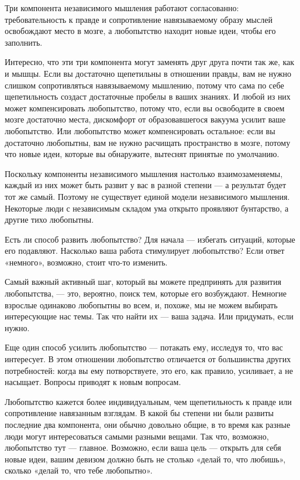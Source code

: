 \documentclass[ebook,12pt,oneside,openany]{memoir}
\begin{document}
Три компонента независимого мышления работают согласованно:
требовательность к правде и сопротивление навязываемому образу мыслей
освобождают место в мозге, а любопытство находит новые идеи, чтобы его
заполнить. \newline

Интересно, что эти три компонента могут заменять друг друга почти так
же, как и мышцы. Если вы достаточно щепетильны в отношении правды, вам
не нужно слишком сопротивляться навязываемому мышлению, потому что
сама по себе щепетильность создаст достаточные пробелы в ваших
знаниях. И любой из них может компенсировать любопытство, потому что,
если вы освободите в своем мозге достаточно места, дискомфорт от
образовавшегося вакуума усилит ваше любопытство. Или любопытство может
компенсировать остальное: если вы достаточно любопытны, вам не нужно
расчищать пространство в мозге, потому что новые идеи, которые вы
обнаружите, вытеснят принятые по умолчанию. \newline

Поскольку компоненты независимого мышления настолько взаимозаменяемы,
каждый из них может быть развит у вас в разной степени — а результат
будет тот же самый. Поэтому не существует единой модели независимого
мышления. Некоторые люди с независимым складом ума открыто проявляют
бунтарство, а другие тихо любопытны. \newline

Есть ли способ развить любопытство? Для начала — избегать ситуаций,
которые его подавляют. Насколько ваша работа стимулирует любопытство?
Если ответ «немного», возможно, стоит что-то изменить. \newline

Самый важный активный шаг, который вы можете предпринять для развития
любопытства, — это, вероятно, поиск тем, которые его возбуждают.
Немногие взрослые одинаково любопытны во всем, и, похоже, мы не можем
выбирать интересующие нас темы. Так что найти их — ваша задача. Или
придумать, если нужно. \newline

Еще один способ усилить любопытство — потакать ему, исследуя то, что
вас интересует. В этом отношении любопытство отличается от большинства
других потребностей: когда вы ему потворствуете, это его, как правило,
усиливает, а не насыщает. Вопросы приводят к новым вопросам. \newline

Любопытство кажется более индивидуальным, чем щепетильность к правде
или сопротивление навязанным взглядам. В какой бы степени ни были
развиты последние два компонента, они обычно довольно общие, в то
время как разные люди могут интересоваться самыми разными вещами. Так
что, возможно, любопытство тут — главное. Возможно, если ваша цель —
открыть для себя новые идеи, вашим девизом должно быть не столько
«делай то, что любишь», сколько «делай то, что тебе любопытно».
\end{document}
